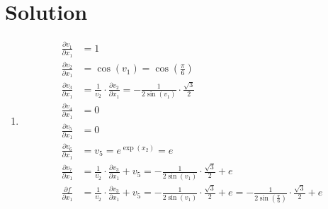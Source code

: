 \documentclass[submit]{harvardml}
\newenvironment{answer}
  {\section*{Solution}}
{}
\begin{document}
\begin{answer}
\begin{enumerate}
\begin{enumerate}
            \item
                  \begin{align*}
\frac{\partial v_1}{\partial x_1} &= 1 \\
\frac{\partial v_2}{\partial x_1} &= \cos(v_1) = \cos\left(\frac{\pi}{6}\right) \\
\frac{\partial v_3}{\partial x_1} &= \frac{1}{v_2} \cdot \frac{\partial v_2}{\partial x_1} = -\frac{1}{2\sin(v_1)} \cdot \frac{\sqrt{3}}{2} \\
\frac{\partial v_4}{\partial x_1} &= 0 \\
\frac{\partial v_5}{\partial x_1} &= 0 \\
\frac{\partial v_6}{\partial x_1} &= v_5 = e^{\exp(x_2)} = e \\
\frac{\partial v_7}{\partial x_1} &= \frac{1}{v_2} \cdot \frac{\partial v_3}{\partial x_1} + v_5 = -\frac{1}{2\sin(v_1)} \cdot \frac{\sqrt{3}}{2} + e \\
\frac{\partial f}{\partial x_1} &= \frac{1}{v_2} \cdot \frac{\partial v_3}{\partial x_1} + v_5 = -\frac{1}{2\sin(v_1)} \cdot \frac{\sqrt{3}}{2} + e = -\frac{1}{2\sin\left(\frac{\pi}{6}\right)} \cdot \frac{\sqrt{3}}{2} + e
                  \end{align*}
          \end{enumerate}

  \end{enumerate}
\end{answer}


\newpage

\end{document}
